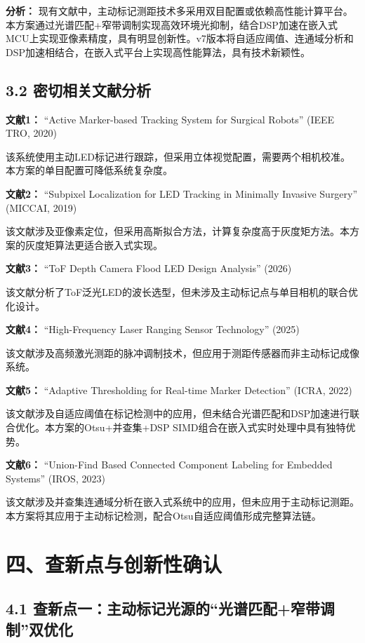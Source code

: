 \documentclass[12pt,a4paper]{article}
\begin{document}
\textbf{分析：} 现有文献中，主动标记测距技术多采用双目配置或依赖高性能计算平台。本方案通过光谱匹配+窄带调制实现高效环境光抑制，结合DSP加速在嵌入式MCU上实现亚像素精度，具有明显创新性。v7版本将自适应阈值、连通域分析和DSP加速相结合，在嵌入式平台上实现高性能算法，具有技术新颖性。

\subsection{3.2 密切相关文献分析}

\textbf{文献1：} ``Active Marker-based Tracking System for Surgical Robots'' (IEEE TRO, 2020)

该系统使用主动LED标记进行跟踪，但采用立体视觉配置，需要两个相机校准。本方案的单目配置可降低系统复杂度。

\textbf{文献2：} ``Subpixel Localization for LED Tracking in Minimally Invasive Surgery'' (MICCAI, 2019)

该文献涉及亚像素定位，但采用高斯拟合方法，计算复杂度高于灰度矩方法。本方案的灰度矩算法更适合嵌入式实现。

\textbf{文献3：} ``ToF Depth Camera Flood LED Design Analysis'' (2026)

该文献分析了ToF泛光LED的波长选型，但未涉及主动标记点与单目相机的联合优化设计。

\textbf{文献4：} ``High-Frequency Laser Ranging Sensor Technology'' (2025)

该文献涉及高频激光测距的脉冲调制技术，但应用于测距传感器而非主动标记成像系统。

\textbf{文献5：} ``Adaptive Thresholding for Real-time Marker Detection'' (ICRA, 2022)

该文献涉及自适应阈值在标记检测中的应用，但未结合光谱匹配和DSP加速进行联合优化。本方案的Otsu+并查集+DSP SIMD组合在嵌入式实时处理中具有独特优势。

\textbf{文献6：} ``Union-Find Based Connected Component Labeling for Embedded Systems'' (IROS, 2023)

该文献涉及并查集连通域分析在嵌入式系统中的应用，但未应用于主动标记测距。本方案将其应用于主动标记检测，配合Otsu自适应阈值形成完整算法链。

\newpage

\section{四、查新点与创新性确认}

\subsection{4.1 查新点一：主动标记光源的``光谱匹配+窄带调制''双优化}
\end{document}
